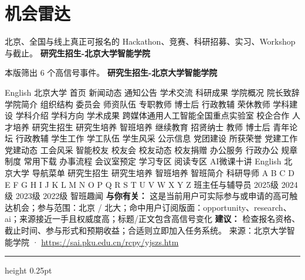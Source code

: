 \documentclass[10.5pt]{ctexart}
\begin{document}
\section*{机会雷达}
{\color{ormuted} 北京、全国与线上真正可报名的 Hackathon、竞赛、科研招募、实习、Workshop 与截止。}
\vspace{2mm}
{\LARGE\bfseries 研究生招生-北京大学智能学院}\par
\vspace{1mm}
{\color{ormuted} 本版筛出 6 个高信号事件。}
\vspace{3mm}
{\Large\bfseries 研究生招生-北京大学智能学院}\par
English 北京大学 首页 新闻动态 通知公告 学术交流 科研成果 学院概况 院长致辞 学院简介 组织结构 委员会 师资队伍 专职教师 博士后 行政教辅 荣休教师 学科建设 学科介绍 学科方向 学术成果 跨媒体通用人工智能全国重点实验室 校企合作 人才培养 研究生招生 研究生培养 智班培养 继续教育 招贤纳士 教师 博士后 青年论坛 行政教辅 学生工作 学工队伍 学生风采 公示信息 党团建设 所获荣誉 党建工作 党建动态 工会风采 智能校友 校友会 校友动态 校友捐赠 办公服务 行政办公 规章制度 常用下载 办事流程 会议室预定 学习专区 阅读专区 AI微课十讲 English 北京大学 导航菜单 研究生招生 研究生培养 智班培养 智班简介 科研导师 A B C D E F G H I J K L M N O P Q R S T U V W X Y Z 班主任与辅导员 2025级 2024级 2023级 2022级 智班趣闻
\textbf{与你有关：} 这是当前用户可实际参与或申请的高可触达机会；参与范围：北京 / 北大；命中用户订阅版面：opportunity、research、ai；来源接近一手且权威度高；标题/正文包含高信号变化
\textbf{建议：} 检查报名资格、截止时间、参与形式和预期收益；合适则立即加入任务系统。
{\footnotesize\color{ormuted} 来源：北京大学智能学院 · \url{https://sai.pku.edu.cn/rcpy/yjszs.htm}}
\vspace{4mm}
\hrule height 0.25pt
\vspace{3mm}
\end{document}
